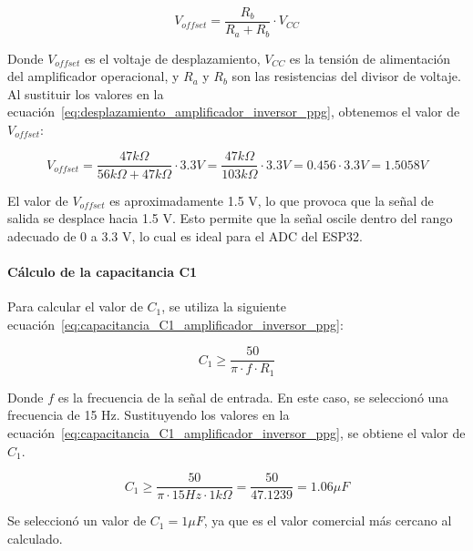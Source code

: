         \begin{equation}
            \label{eq:desplazamiento_amplificador_inversor_ppg}
            V_{offset} = \frac{R_b}{R_a + R_b} \cdot V_{CC}
        \end{equation}

        Donde $V_{offset}$ es el voltaje de desplazamiento, $V_{CC}$ es la tensión de alimentación del amplificador operacional, y $R_a$ y $R_b$ son las resistencias del divisor de voltaje. Al sustituir los valores en la ecuación~\ref{eq:desplazamiento_amplificador_inversor_ppg}, obtenemos el valor de $V_{offset}$:

        \begin{equation}
            V_{offset} = \frac{47k\Omega}{56k\Omega + 47k\Omega} \cdot 3.3 V = \frac{47k\Omega}{103k\Omega} \cdot 3.3 V = 0.456 \cdot 3.3 V = 1.5058 V
        \end{equation}

        El valor de $V_{offset}$ es aproximadamente 1.5 V, lo que provoca que la señal de salida se desplace hacia 1.5 V. Esto permite que la señal oscile dentro del rango adecuado de 0 a 3.3 V, lo cual es ideal para el ADC del ESP32.

        \paragraph{Cálculo de la capacitancia C1}
        Para calcular el valor de $C_1$, se utiliza la siguiente ecuación~\ref{eq:capacitancia_C1_amplificador_inversor_ppg}:

        \begin{equation}
            \label{eq:capacitancia_C1_amplificador_inversor_ppg}
            C_1 \geq \frac{50}{\pi \cdot f \cdot R_1}
        \end{equation}

        Donde $f$ es la frecuencia de la señal de entrada. En este caso, se seleccionó una frecuencia de 15 Hz. Sustituyendo los valores en la ecuación~\ref{eq:capacitancia_C1_amplificador_inversor_ppg}, se obtiene el valor de $C_1$.

        \begin{equation}
            C_1 \geq \frac{50}{\pi \cdot 15 Hz \cdot 1k\Omega} = \frac{50}{47.1239} = 1.06 \mu F
        \end{equation}

        Se seleccionó un valor de $C_1 = 1 \mu F$, ya que es el valor comercial más cercano al calculado.

